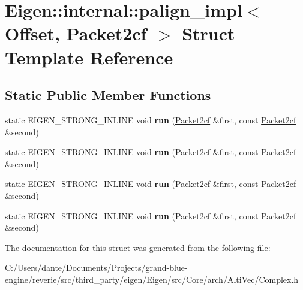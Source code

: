 \hypertarget{struct_eigen_1_1internal_1_1palign__impl_3_01_offset_00_01_packet2cf_01_4}{}\section{Eigen\+::internal\+::palign\+\_\+impl$<$ Offset, Packet2cf $>$ Struct Template Reference}
\label{struct_eigen_1_1internal_1_1palign__impl_3_01_offset_00_01_packet2cf_01_4}
\subsection*{Static Public Member Functions}
\begin{DoxyCompactItemize}
\item 
\mbox{\label{struct_eigen_1_1internal_1_1palign__impl_3_01_offset_00_01_packet2cf_01_4_a646ffaa2ab1f139214316298785aec89}} 
static E\+I\+G\+E\+N\+\_\+\+S\+T\+R\+O\+N\+G\+\_\+\+I\+N\+L\+I\+NE void {\bfseries run} (\mbox{\hyperlink{struct_eigen_1_1internal_1_1_packet2cf}{Packet2cf}} \&first, const \mbox{\hyperlink{struct_eigen_1_1internal_1_1_packet2cf}{Packet2cf}} \&second)
\item 
\mbox{\label{struct_eigen_1_1internal_1_1palign__impl_3_01_offset_00_01_packet2cf_01_4_a646ffaa2ab1f139214316298785aec89}} 
static E\+I\+G\+E\+N\+\_\+\+S\+T\+R\+O\+N\+G\+\_\+\+I\+N\+L\+I\+NE void {\bfseries run} (\mbox{\hyperlink{struct_eigen_1_1internal_1_1_packet2cf}{Packet2cf}} \&first, const \mbox{\hyperlink{struct_eigen_1_1internal_1_1_packet2cf}{Packet2cf}} \&second)
\item 
\mbox{\label{struct_eigen_1_1internal_1_1palign__impl_3_01_offset_00_01_packet2cf_01_4_a646ffaa2ab1f139214316298785aec89}} 
static E\+I\+G\+E\+N\+\_\+\+S\+T\+R\+O\+N\+G\+\_\+\+I\+N\+L\+I\+NE void {\bfseries run} (\mbox{\hyperlink{struct_eigen_1_1internal_1_1_packet2cf}{Packet2cf}} \&first, const \mbox{\hyperlink{struct_eigen_1_1internal_1_1_packet2cf}{Packet2cf}} \&second)
\item 
\mbox{\label{struct_eigen_1_1internal_1_1palign__impl_3_01_offset_00_01_packet2cf_01_4_a646ffaa2ab1f139214316298785aec89}} 
static E\+I\+G\+E\+N\+\_\+\+S\+T\+R\+O\+N\+G\+\_\+\+I\+N\+L\+I\+NE void {\bfseries run} (\mbox{\hyperlink{struct_eigen_1_1internal_1_1_packet2cf}{Packet2cf}} \&first, const \mbox{\hyperlink{struct_eigen_1_1internal_1_1_packet2cf}{Packet2cf}} \&second)
\end{DoxyCompactItemize}


The documentation for this struct was generated from the following file\+:\begin{DoxyCompactItemize}
\item 
C\+:/\+Users/dante/\+Documents/\+Projects/grand-\/blue-\/engine/reverie/src/third\+\_\+party/eigen/\+Eigen/src/\+Core/arch/\+Alti\+Vec/Complex.\+h\end{DoxyCompactItemize}
